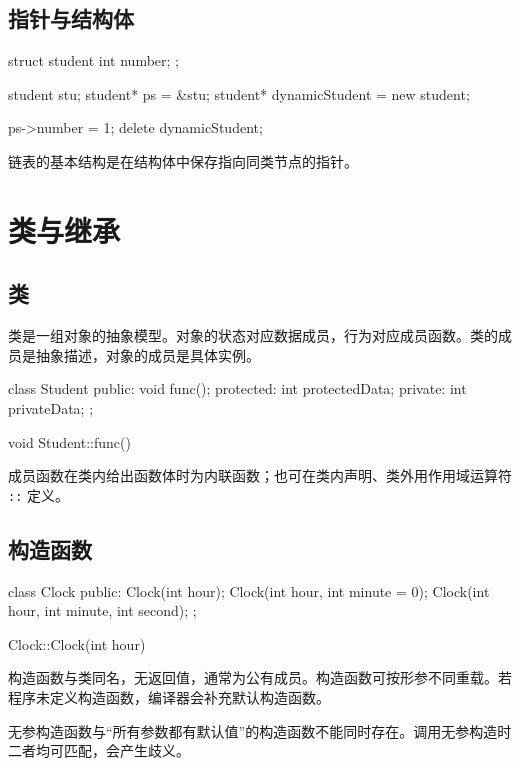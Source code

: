 \documentclass[UTF8,fontset=fandol,zihao=5]{ctexart}
\newcommand{\code}[1]{\texttt{#1}}
\begin{document}
\subsection{指针与结构体}

\begin{cppcode}[结构体指针]
struct student {
    int number;
};

student stu{};
student* ps = &stu;
student* dynamicStudent = new student;

ps->number = 1;
delete dynamicStudent;
\end{cppcode}

链表的基本结构是在结构体中保存指向同类节点的指针。

\section{类与继承}

\subsection{类}

类是一组对象的抽象模型。对象的状态对应数据成员，行为对应成员函数。类的成员是抽象描述，对象的成员是具体实例。

\begin{cppcode}[类的声明]
class Student {
public:
    void func();
protected:
    int protectedData;
private:
    int privateData;
};

void Student::func() {
}
\end{cppcode}

成员函数在类内给出函数体时为内联函数；也可在类内声明、类外用作用域运算符 \code{::} 定义。

\subsection{构造函数}

\begin{cppcode}[构造函数]
class Clock {
public:
    Clock(int hour);
    Clock(int hour, int minute = 0);
    Clock(int hour, int minute, int second);
};

Clock::Clock(int hour) {
}
\end{cppcode}

构造函数与类同名，无返回值，通常为公有成员。构造函数可按形参不同重载。若程序未定义构造函数，编译器会补充默认构造函数。

\begin{method}[构造函数歧义]
无参构造函数与“所有参数都有默认值”的构造函数不能同时存在。调用无参构造时二者均可匹配，会产生歧义。
\end{method}
\end{document}
